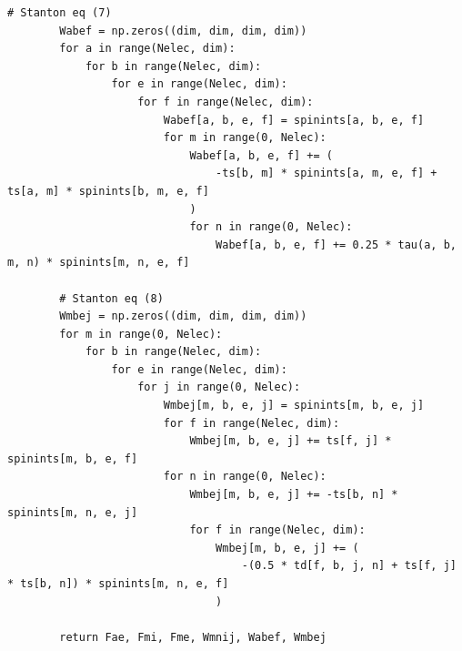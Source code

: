 \begin{lstlisting}[style=MyPython]
        # Stanton eq (7)
        Wabef = np.zeros((dim, dim, dim, dim))
        for a in range(Nelec, dim):
            for b in range(Nelec, dim):
                for e in range(Nelec, dim):
                    for f in range(Nelec, dim):
                        Wabef[a, b, e, f] = spinints[a, b, e, f]
                        for m in range(0, Nelec):
                            Wabef[a, b, e, f] += (
                                -ts[b, m] * spinints[a, m, e, f] + ts[a, m] * spinints[b, m, e, f]
                            )
                            for n in range(0, Nelec):
                                Wabef[a, b, e, f] += 0.25 * tau(a, b, m, n) * spinints[m, n, e, f]

        # Stanton eq (8)
        Wmbej = np.zeros((dim, dim, dim, dim))
        for m in range(0, Nelec):
            for b in range(Nelec, dim):
                for e in range(Nelec, dim):
                    for j in range(0, Nelec):
                        Wmbej[m, b, e, j] = spinints[m, b, e, j]
                        for f in range(Nelec, dim):
                            Wmbej[m, b, e, j] += ts[f, j] * spinints[m, b, e, f]
                        for n in range(0, Nelec):
                            Wmbej[m, b, e, j] += -ts[b, n] * spinints[m, n, e, j]
                            for f in range(Nelec, dim):
                                Wmbej[m, b, e, j] += (
                                    -(0.5 * td[f, b, j, n] + ts[f, j] * ts[b, n]) * spinints[m, n, e, f]
                                )

        return Fae, Fmi, Fme, Wmnij, Wabef, Wmbej
\end{lstlisting}

\vspace{5pt}

\noindent

\vspace{5pt}

